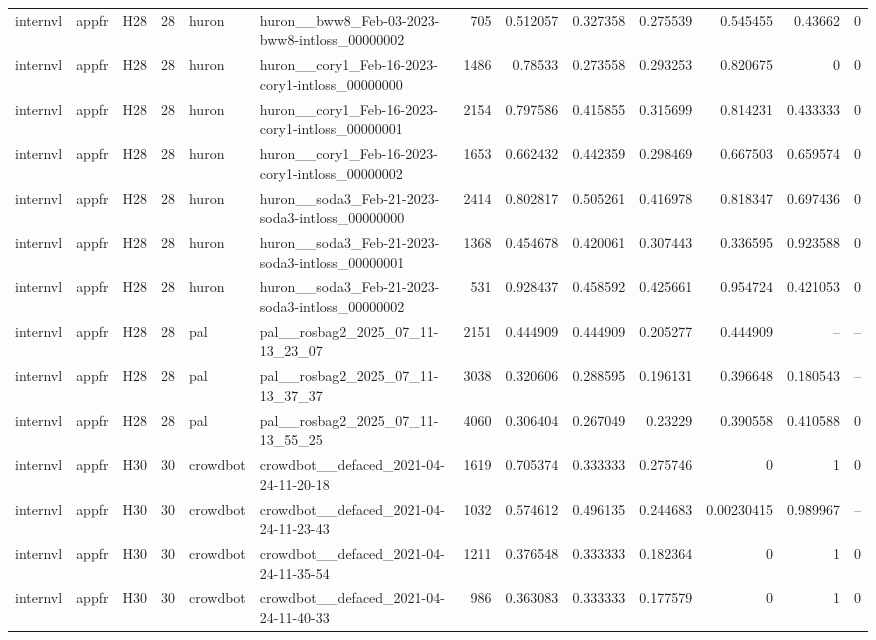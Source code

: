 \begin{longtable}{lllrllrrrrrrr}
internvl & appfr & H28 & 28 & huron & huron\_\_bww8\_Feb-03-2023-bww8-intloss\_00000002 & 705 & 0.512057 & 0.327358 & 0.275539 & 0.545455 & 0.43662 & 0 \\
internvl & appfr & H28 & 28 & huron & huron\_\_cory1\_Feb-16-2023-cory1-intloss\_00000000 & 1486 & 0.78533 & 0.273558 & 0.293253 & 0.820675 & 0 & 0 \\
internvl & appfr & H28 & 28 & huron & huron\_\_cory1\_Feb-16-2023-cory1-intloss\_00000001 & 2154 & 0.797586 & 0.415855 & 0.315699 & 0.814231 & 0.433333 & 0 \\
internvl & appfr & H28 & 28 & huron & huron\_\_cory1\_Feb-16-2023-cory1-intloss\_00000002 & 1653 & 0.662432 & 0.442359 & 0.298469 & 0.667503 & 0.659574 & 0 \\
internvl & appfr & H28 & 28 & huron & huron\_\_soda3\_Feb-21-2023-soda3-intloss\_00000000 & 2414 & 0.802817 & 0.505261 & 0.416978 & 0.818347 & 0.697436 & 0 \\
internvl & appfr & H28 & 28 & huron & huron\_\_soda3\_Feb-21-2023-soda3-intloss\_00000001 & 1368 & 0.454678 & 0.420061 & 0.307443 & 0.336595 & 0.923588 & 0 \\
internvl & appfr & H28 & 28 & huron & huron\_\_soda3\_Feb-21-2023-soda3-intloss\_00000002 & 531 & 0.928437 & 0.458592 & 0.425661 & 0.954724 & 0.421053 & 0 \\
internvl & appfr & H28 & 28 & pal & pal\_\_rosbag2\_2025\_07\_11-13\_23\_07 & 2151 & 0.444909 & 0.444909 & 0.205277 & 0.444909 & -- & -- \\
internvl & appfr & H28 & 28 & pal & pal\_\_rosbag2\_2025\_07\_11-13\_37\_37 & 3038 & 0.320606 & 0.288595 & 0.196131 & 0.396648 & 0.180543 & -- \\
internvl & appfr & H28 & 28 & pal & pal\_\_rosbag2\_2025\_07\_11-13\_55\_25 & 4060 & 0.306404 & 0.267049 & 0.23229 & 0.390558 & 0.410588 & 0 \\
internvl & appfr & H30 & 30 & crowdbot & crowdbot\_\_defaced\_2021-04-24-11-20-18 & 1619 & 0.705374 & 0.333333 & 0.275746 & 0 & 1 & 0 \\
internvl & appfr & H30 & 30 & crowdbot & crowdbot\_\_defaced\_2021-04-24-11-23-43 & 1032 & 0.574612 & 0.496135 & 0.244683 & 0.00230415 & 0.989967 & -- \\
internvl & appfr & H30 & 30 & crowdbot & crowdbot\_\_defaced\_2021-04-24-11-35-54 & 1211 & 0.376548 & 0.333333 & 0.182364 & 0 & 1 & 0 \\
internvl & appfr & H30 & 30 & crowdbot & crowdbot\_\_defaced\_2021-04-24-11-40-33 & 986 & 0.363083 & 0.333333 & 0.177579 & 0 & 1 & 0 \\

\end{longtable}
